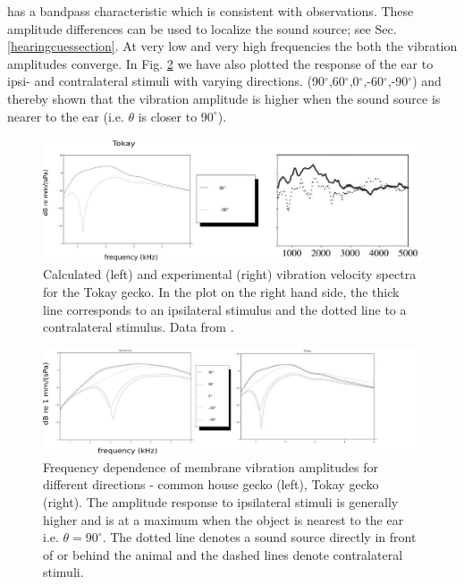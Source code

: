 has a bandpass characteristic which is consistent with observations.
These amplitude differences can be used to localize the sound source; see Sec. \ref{hearingcuessection}. At very low and very high frequencies the both the vibration amplitudes
converge.  In Fig. \ref{freqdepboth} we  have also plotted the response of the ear to ipsi- and contralateral stimuli with varying directions. (90$^\circ$,60$^\circ$,0$^\circ$,-60$^\circ$,-90$^\circ$)
and thereby shown that the vibration amplitude is higher when the sound source is nearer to the ear (i.e. $\theta$ is closer to $90^\circ$).
\begin{figure}[ht!]
 \centering
 \includegraphics[width=1.0\linewidth]{Diagrams/Plots/tokayipsivscontrafull.png}
 \caption[Frequency dependence of ipsi- and contralateral membrane vibration amplitudes - Tokay gecko]{Calculated (left) and experimental (right) vibration velocity spectra for the Tokay gecko. In
 the plot on the right hand side, the thick line corresponds to an ipsilateral stimulus and the dotted line to a contralateral stimulus.  Data from \cite{dalsgaardmanley1}.}
  \label{tokayipsivscontrafull}
\end{figure}
\begin{figure}[ht!]
 \centering
  \includegraphics[width=1.15\linewidth]{Diagrams/Plots/freqdepboth.png}
  \caption[Frequency dependence of membrane vibration amplitudes for different directions.]{Frequency dependence of membrane vibration amplitudes for different directions - common house gecko (left), Tokay gecko (right). 
  The amplitude response to ipsilateral stimuli is generally higher and is at a maximum when the object is nearest to the ear i.e. $\theta=90^\circ$. The dotted line denotes a sound source directly in front of or behind the animal and the dashed lines denote contralateral stimuli.}
  \label{freqdepboth}
\end{figure}

